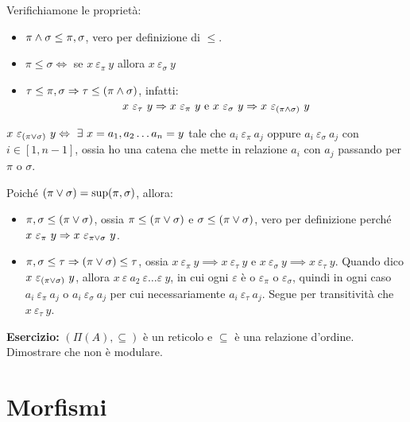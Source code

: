 Verifichiamone le propriet\`a:
\begin{itemize}
  \item $\pi \wedge \sigma \le \pi, \sigma$, vero per definizione di $\le$.
  \item $\pi \le \sigma \iff $ se $ x \ \varepsilon_{\pi} \ y $ allora $x \ \varepsilon_{\sigma} \ y$
  \item $\tau \le \pi, \sigma \Rightarrow \tau \le (\pi \wedge \sigma)$, infatti:
   \[
   x \ \varepsilon_{\tau} \ y \implies 
   x \ \varepsilon_{\pi} \ y \text{ e }
   x \ \varepsilon_{\sigma} \ y 
   \implies x \ \varepsilon_{(\pi \infop \sigma)} \ y
   \]
\end{itemize}

\begin{defn}
$x \ \varepsilon_{(\pi \supop \sigma)} \ y \iff \exists x = a_1, a_2 \dots a_n = y $ tale che $a_i \ \varepsilon_{\pi} \ a_j$ oppure $a_i \ \varepsilon_{\sigma} \ a_j$ con $i \in [1, n-1]$, ossia ho una catena che mette in relazione $a_i$ con $a_j$ passando per $\pi$ o $\sigma$.
\end{defn}

Poich\'e $(\pi \vee \sigma) = \sup (\pi, \sigma)$, allora:
\begin{itemize}
  \item $\pi, \sigma \le (\pi \vee \sigma)$, ossia $\pi \le (\pi \vee \sigma)$ e $\sigma \le (\pi \vee \sigma)$, vero per definizione perch\'e $x \ \varepsilon_{\pi} \ y \implies x \ \varepsilon_{\pi \supop \sigma} \ y$.
  \item $\pi, \sigma \le \tau \Rightarrow (\pi \vee \sigma) \le \tau$, ossia $x \ \varepsilon_{\pi} \ y \implies x \ \varepsilon_{\tau} \ y$ e $x \ \varepsilon_{\sigma} \ y \implies x \ \varepsilon_{\tau} \ y$. Quando dico $x \ \varepsilon_{(\pi \vee \sigma)} \ y$, allora $x \ \varepsilon \ a_2 \ \varepsilon \dots \varepsilon \ y$, in cui ogni $\varepsilon$ \`e o $\varepsilon_{\pi}$ o $\varepsilon_{\sigma}$, quindi in ogni caso $a_i \ \varepsilon_{\pi} \ a_j$ o $a_i \ \varepsilon_{\sigma} \ a_j$ per cui necessariamente $a_i \ \varepsilon_{\tau} \ a_j$. Segue per transitivit\`a che $x \ \varepsilon_{\tau} \ y$.
\end{itemize}

\textbf{Esercizio:} $(\Pi(A), \subseteq)$ \`e un reticolo e $\subseteq$ \`e una relazione d'ordine. Dimostrare che non \`e modulare.
\vspace{5cm}

\section{Morfismi}

